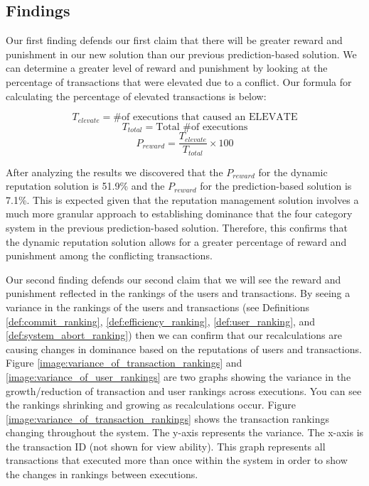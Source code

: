 \subsection{Findings}
\label{sec:anal_findings}

Our first finding defends our first claim that there will be greater reward and punishment in our new solution than our previous prediction-based solution. We can determine a greater level of reward and punishment by looking at the percentage of transactions that were elevated due to a conflict. Our formula for calculating the percentage of elevated transactions is below:

\[\textrm{$T_{elevate}$} = \textrm{\# of executions that caused an ELEVATE}\]
\[\textrm{$T_{total}$} = \textrm{Total \# of executions}\]
\[\textrm{$P_{reward}$} =\frac{\textrm{$T_{elevate}$}}{\textrm{$T_{total}$}} \times 100\]
 
After analyzing the results we discovered that the $P_{reward}$ for the dynamic reputation solution is 51.9\% and the $P_{reward}$ for the prediction-based solution is 7.1\%. This is expected given that the reputation management solution involves a much more granular approach to establishing dominance that the four category system in the previous prediction-based solution. Therefore, this confirms that the dynamic reputation solution allows for a greater percentage of reward and punishment among the conflicting transactions.

Our second finding defends our second claim that we will see the reward and punishment reflected in the rankings of the users and transactions. By seeing a variance in the rankings of the users and transactions (see Definitions \ref{def:commit_ranking}, \ref{def:efficiency_ranking}, \ref{def:user_ranking},  and \ref{def:system_abort_ranking}) then we can confirm that our recalculations are causing changes in dominance based on the reputations of users and transactions. Figure \ref{image:variance_of_transaction_rankings} and \ref{image:variance_of_user_rankings} are two graphs showing the variance in the growth/reduction of transaction and user rankings across executions. You can see the rankings shrinking and growing as recalculations occur. Figure \ref{image:variance_of_transaction_rankings} shows the transaction rankings changing throughout the system. The y-axis represents the variance. The x-axis is the transaction ID (not shown for view ability). This graph represents all transactions that executed more than once within the system in order to show the changes in rankings between executions.

